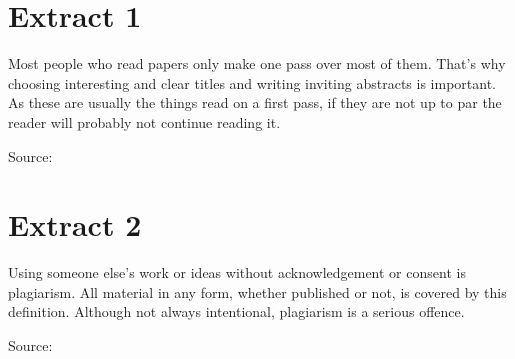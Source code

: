 \section*{Extract 1}
\label{sec:extract_1}

Most people who read papers only make one pass over most of them. That's why
choosing interesting and clear titles and writing inviting abstracts is
important. As these are usually the things read on a first pass, if they are
not up to par the reader will probably not continue reading it.

Source:~\cite{Keshav2012}


\section*{Extract 2}
\label{sec:extract_2}

Using someone else's work or ideas without acknowledgement or consent is
plagiarism. All material in any form, whether published or not, is covered by
this definition. Although not always intentional, plagiarism is a serious
offence.

Source:~\cite{Oxford2016}



